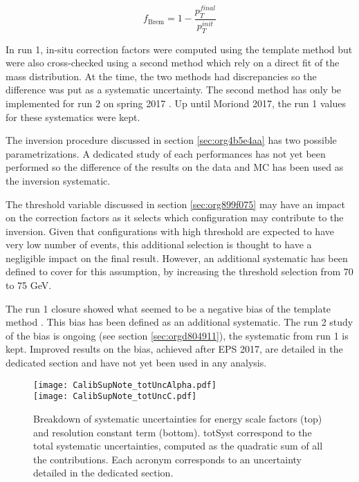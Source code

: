 \begin{equation}
\label{eq:orgd9a7270}
f_{\text{Brem}} = 1 - \frac{p_T^{final}}{p_T^{init}}
\end{equation}

In run 1, in-situ correction factors were computed using the template method but were also cross-checked using a second method which rely on a direct fit of the mass distribution.
At the time, the two methods had discrepancies so the difference was put as a systematic uncertainty.
The second method has only be implemented for run 2 on spring 2017 \cite{ATL-COM-PHYS-2017-757}.
Up until Moriond 2017, the run 1 values for these systematics were kept.

The inversion procedure discussed in section \ref{sec:org4b5e4aa} has two possible para\-me\-tri\-zations.
A dedicated study of each performances has not yet been performed so the difference of the results on the data and MC has been used as the inversion systematic.

The threshold variable discussed in section \ref{sec:org899f075} may have an impact on the correction factors as it selects which configuration may contribute to the inversion.
Given that configurations with high threshold are expected to have very low number of events, this additional selection is thought to have a negligible impact on the final result.
However, an additional systematic has been defined to cover for this assumption, by increasing the threshold selection from 70 to 75 GeV.

The run 1 closure showed what seemed to be a negative bias of the template method \cite{ATL-COM-PHYS-2013-1653}.
This bias has been defined as an additional systematic.
The run 2 study of the bias is ongoing (see section \ref{sec:orgd804911}), the systematic from run 1 is kept.
Improved results on the bias, achieved after EPS 2017, are detailed in the dedicated section and have not yet been used in any analysis.

\begin{figure}
  \centering
\texttt{[image: CalibSupNote\_totUncAlpha.pdf]}\\
\texttt{[image: CalibSupNote\_totUncC.pdf]}
\caption{\label{org5c57d23}
  Breakdown of systematic uncertainties for energy scale factors (top) and resolution constant term (bottom).
  totSyst correspond to the total systematic uncertainties, computed as the quadratic sum of all the contributions.
  Each acronym corresponds to an uncertainty detailed in the dedicated section.
}
\end{figure}



